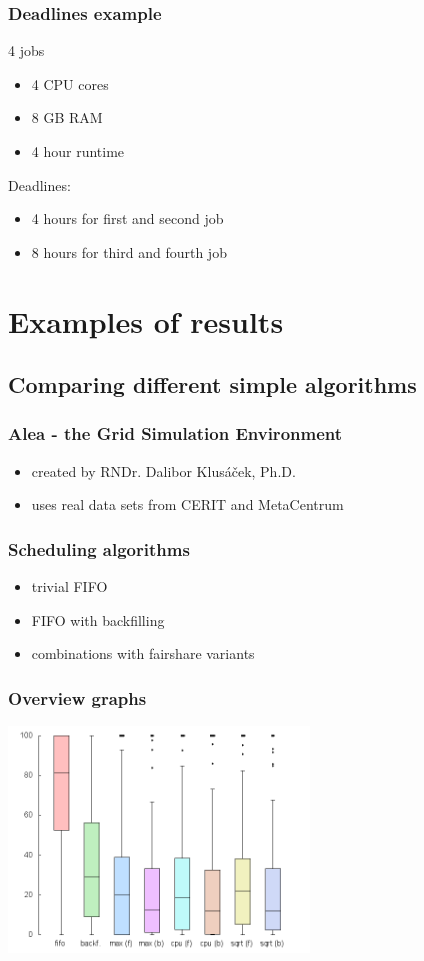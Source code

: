 \begin{frame}
	\frametitle{Deadlines example}
	4 jobs
	\begin{itemize}
		\item 4 CPU cores
		\item 8 GB RAM
		\item 4 hour runtime
	\end{itemize}
	Deadlines:
	\begin{itemize}
		\item 4 hours for first and second job
		\item 8 hours for third and fourth job
	\end{itemize}
\end{frame}

\section{Examples of results}
\subsection{Comparing different simple algorithms}

\begin{frame}
	\frametitle{Alea - the Grid Simulation Environment}
	\begin{itemize}
		\item created by RNDr. Dalibor Klusáček, Ph.D.
		\item uses real data sets from CERIT and MetaCentrum
	\end{itemize}
\end{frame}

\begin{frame}
	\frametitle{Scheduling algorithms}
	\begin{itemize}
		\item trivial FIFO
		\item FIFO with backfilling
		\item combinations with fairshare variants
	\end{itemize}
\end{frame}

\begin{frame}
	\frametitle{Overview graphs}
	\begin{center}
	\includegraphics[width=0.6\textwidth]{perc_deadline.png}
	\end{center}
\end{frame}

